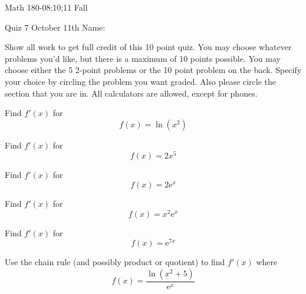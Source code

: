 \documentclass[11pt,epsfig]{article}
\begin{document}
Math 180-08;10;11 Fall

Quiz 7 October 11th \hspace{1.9in} {Name:} {\underline {\hspace{2.5in}}}
\vspace{2pc}

Show all work to get full credit of this 10 point quiz. You may choose whatever problems you'd like, but there is a maximum of 10 points possible. You may choose either the 5 2-point problems or the 10 point problem on the back. Specify your choice by circling the problem you want graded. Also please circle the section that you are in. All calculators are allowed, except for phones.
\vspace{2pc}

\begin{problem}{2}
Find $f'(x)$ for
\begin{equation*}
f(x) = \ln (x^2)
\end{equation*}
\vfill
\end{problem}

\begin{problem}{2}
Find $f'(x)$ for
\begin{equation*}
f(x) = 2x^5
\end{equation*}
\vfill
\end{problem}

\begin{problem}{2}
Find $f'(x)$ for
\begin{equation*}
f(x) = 2 \mathrm{e}^x
\end{equation*}
\vfill
\end{problem}

\begin{problem}{2}
Find $f'(x)$ for
\begin{equation*}
f(x) = x^2 \mathrm{e}^x
\end{equation*}
\vfill
\end{problem}

\begin{problem}{2}
Find $f'(x)$ for
\begin{equation*}
f(x) = \mathrm{e}^{7x}
\end{equation*}
\vfill
\end{problem}




\newpage

\begin{problem}{10}
Use the chain rule (and possibly product or quotient) to find $f'(x)$ where
\begin{equation*}
f(x) = \frac{\ln (x^2 + 5)}{\mathrm{e}^x}
\end{equation*}
\vfill
\end{problem}





\showpoints
\end{document}
